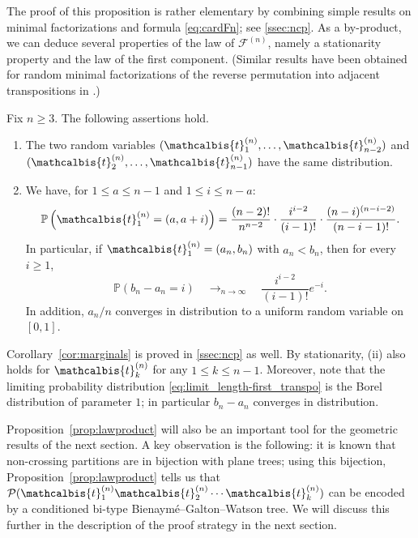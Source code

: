 \documentclass[10pt]{amsart}
\theoremstyle{definition}\newtheorem{defi}[theo]{Definition}\newtheorem{rema}[theo]{Remark}\newtheorem{exam}[theo]{Example}\newtheorem{exem}[theo]{Example}\newtheorem{nota}[theo]{Notation}
\def\PPP{\mathcal P}
\def\tb{\mathcalbis{t}}
\renewcommand\Pr[1]{\mathbb{P}\left(#1\right)}
\begin{document}
The proof of this proposition is rather elementary by combining simple results on minimal
factorizations and formula \eqref{eq:cardFn}; see \cref{ssec:ncp}.
As a by-product, we can deduce several properties of the law of $ \mathscr{F}^{(n)}$,
namely a stationarity property and the law of the first component.
(Similar results have been obtained for random minimal factorizations of the reverse permutation
into adjacent transpositions in \cite{AHRV07}.)
\begin{corollary}\label{cor:marginals} Fix $n \geq 3$. The following assertions hold.
\begin{enumerate}
\item[(i)] The two random variables $(\tb_{1}^{(n)}, \ldots, \tb_{n-2}^{(n)})$ and $(\tb_{2}^{(n)}, \ldots, \tb^{(n)}_{n-1})$ have the same distribution.
\item[(ii)] We have, for $1 \leq a  \leq n-1$ and $ 1 \leq i \leq n-a$:
\begin{equation}
\label{eq:lawT1}\Pr{\tb_{1}^{(n)}=(a,a+i)}= \frac{(n-2)!}{n^{n-2}} \cdot \frac{i^{i-2}}{(i-1)!} \cdot \frac{(n-i)^{(n-i-2)}} {(n-i-1)!}.	
\end{equation}
In particular,  if $\tb_{1}^{(n)}=(a_{n},b_{n})$  with $a_{n}<b_{n}$, then for every $i \geq 1$,
\begin{equation}
  \Pr{b_{n}-a_{n}=i}  \quad \mathop{\longrightarrow}_{n \rightarrow \infty} \quad  \frac{i^{i-2}}{(i-1)!} e^{-i}.
  \label{eq:limit_length-first_transpo}
\end{equation}
In addition, $a_{n}/n$ converges in distribution to a uniform random variable on $[0,1]$.
\end{enumerate}	
\end{corollary}
Corollary~\ref{cor:marginals} is proved in \cref{ssec:ncp} as well.
By stationarity, (ii) also holds for $\tb_{k}^{(n)}$ for any $1 \le k \le n-1$.
Moreover, note that the limiting probability distribution
\eqref{eq:limit_length-first_transpo} is the Borel distribution of parameter $1$;
in particular $b_n-a_n$ converges in distribution.

Proposition~\ref{prop:lawproduct} will also be an important tool for the geometric  results of the next section.
A key observation is the following: it is known that non-crossing partitions are in bijection with plane trees;
using this bijection, Proposition~\ref{prop:lawproduct} tells us that
$\PPP(\tb_{1}^{(n)} \tb_{2}^{(n)} \cdots \tb_{k}^{(n)})$ can be encoded by
a conditioned
bi-type Bienaym\'e--Galton--Watson tree.
We will discuss this further in the description of the proof strategy in the next section.
\end{document}
